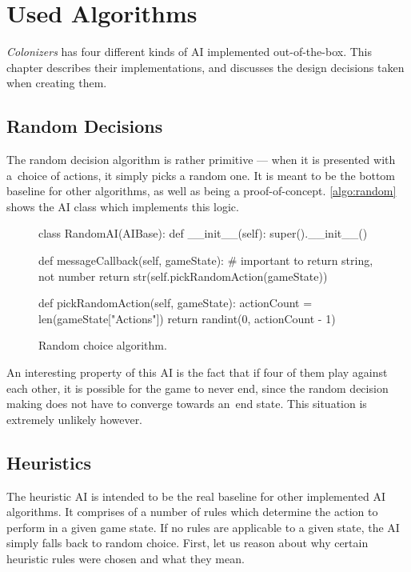 \chapter{Used Algorithms}

\emph{Colonizers} has four different kinds of AI implemented out-of-the-box.
This chapter describes their implementations, and discusses the design decisions
taken when creating them.

\section{Random Decisions}

The random decision algorithm is rather primitive --- when it is presented with
a~choice of actions, it simply picks a random one. It is meant to be
the bottom baseline for other algorithms,
as well as being a proof-of-concept. \autoref{algo:random} shows the AI class which
implements this logic.

\begin{figure}[h!]
\begin{code}[commandchars=\\\{\},codes={\catcode`\$=3\catcode`\^=7\catcode`\_=8}]
class RandomAI(AIBase):
    def \_\_init\_\_(self):
        super().\_\_init\_\_()

    def messageCallback(self, gameState):
        # important to return string, not number
        return str(self.pickRandomAction(gameState))

    def pickRandomAction(self, gameState):
        actionCount = len(gameState["Actions"])
        return randint(0, actionCount - 1)
\end{code}
\caption{Random choice algorithm.}\label{algo:random}
\end{figure}

An interesting property of this AI is the fact that if four of them play
against each other, it is possible for the game to never end, since
the random decision making does not have to converge towards an~end state.
This situation is extremely unlikely however.

\section{Heuristics}
\label{sec:algoheur}

The heuristic AI is intended to be the real baseline for other implemented AI algorithms.
It comprises of a number of rules which determine the action to perform in a given
game state. If no rules are applicable to a given state, the AI simply
falls back to random choice. First, let us reason about why certain heuristic rules
were chosen and what they mean.

